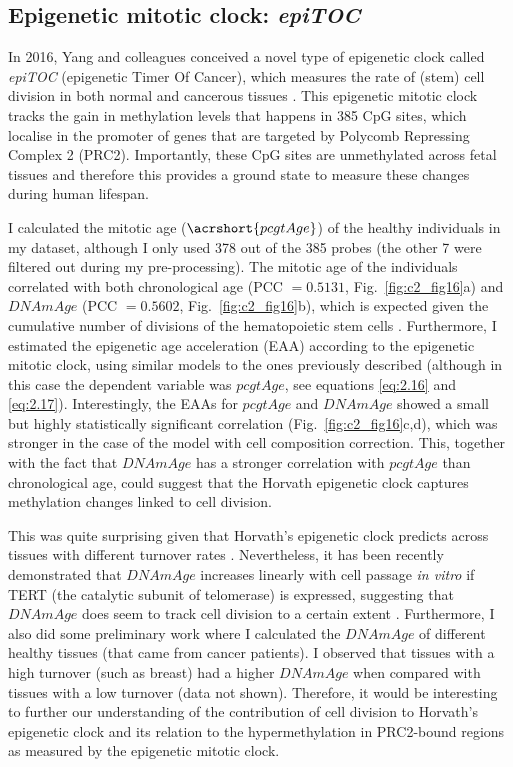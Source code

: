 \subsection{Epigenetic mitotic clock: \textit{epiTOC}} \label{s:2.3.2}

In 2016, Yang and colleagues conceived a novel type of epigenetic clock called \textit{\acrshort{epiTOC}} (epigenetic Timer Of Cancer), which measures the rate of (stem) cell division in both normal and cancerous tissues \cite{Yang2016}. This epigenetic mitotic clock tracks the gain in methylation levels that happens in 385 CpG sites, which localise in the promoter of genes that are targeted by Polycomb Repressing Complex 2 (\acrshort{PRC2}). Importantly, these CpG sites are unmethylated across fetal tissues and therefore this provides a ground state to measure these changes during human lifespan.

\bigskip

I calculated the mitotic age ($\acrshort{pcgtAge}$) of the healthy individuals in my dataset, although I only used 378 out of the 385 probes (the other 7 were filtered out during my pre-processing). The mitotic age of the individuals correlated with both chronological age (PCC $= 0.5131$, Fig.~\ref{fig:c2_fig16}a) and $DNAmAge$ (PCC $= 0.5602$, Fig.~\ref{fig:c2_fig16}b), which is expected given the cumulative number of divisions of the hematopoietic stem cells \cite{Beerman2013}. Furthermore, I estimated the epigenetic age acceleration (EAA) according to the epigenetic mitotic clock, using similar models to the ones previously described (although in this case the dependent variable was $pcgtAge$, see equations \ref{eq:2.16} and \ref{eq:2.17}). Interestingly, the EAAs for $pcgtAge$ and $DNAmAge$ showed a small but highly statistically significant correlation (Fig.~\ref{fig:c2_fig16}c,d), which was stronger in the case of the model with cell composition correction. This, together with the fact that $DNAmAge$ has a stronger correlation with $pcgtAge$ than chronological age, could suggest that the Horvath epigenetic clock captures methylation changes linked to cell division. 

\bigskip

This was quite surprising given that Horvath's epigenetic clock predicts across tissues with different turnover rates \cite{Yang2016}. Nevertheless, it has been recently demonstrated that $DNAmAge$ increases linearly with cell passage \textit{in vitro} if TERT (the catalytic subunit of telomerase) is expressed, suggesting that $DNAmAge$ does seem to track cell division to a certain extent \cite{Lu2018}. Furthermore, I also did some preliminary work where I calculated the $DNAmAge$ of different healthy tissues (that came from cancer patients). I observed that tissues with a high turnover (such as breast) \cite{Horvath2013,Sehl2017} had a higher $DNAmAge$ when compared with tissues with a low turnover (data not shown). Therefore, it would be interesting to further our understanding of the contribution of cell division to Horvath's epigenetic clock and its relation to the hypermethylation in PRC2-bound regions as measured by the epigenetic mitotic clock.    


